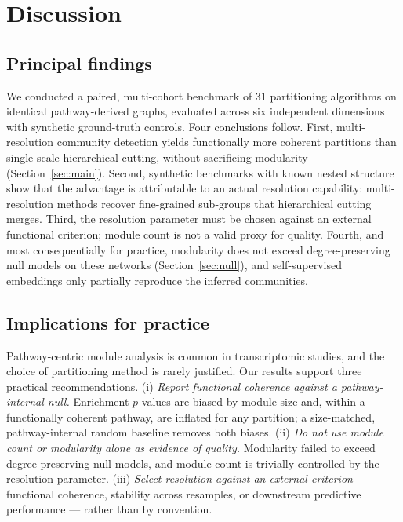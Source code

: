 \documentclass[twocolumn,11pt]{article}
\begin{document}
\section{Discussion}

\subsection{Principal findings}

We conducted a paired, multi-cohort benchmark of 31 partitioning algorithms on identical
pathway-derived graphs, evaluated across six independent dimensions with synthetic
ground-truth controls. Four conclusions follow. First, multi-resolution community detection
yields functionally more coherent partitions than single-scale hierarchical cutting, without
sacrificing modularity (Section~\ref{sec:main}). Second, synthetic benchmarks with known
nested structure show that the advantage is attributable to an actual resolution capability:
multi-resolution methods recover fine-grained sub-groups that hierarchical cutting merges.
Third, the resolution parameter must be chosen against an external functional criterion;
module count is not a valid proxy for quality. Fourth, and most consequentially for practice,
modularity does not exceed degree-preserving null models on these networks
(Section~\ref{sec:null}), and self-supervised embeddings only partially reproduce the
inferred communities.

\subsection{Implications for practice}

Pathway-centric module analysis is common in transcriptomic studies, and the choice of
partitioning method is rarely justified. Our results support three practical
recommendations. (i) \emph{Report functional coherence against a pathway-internal null.}
Enrichment $p$-values are biased by module size and, within a functionally coherent pathway,
are inflated for any partition; a size-matched, pathway-internal random baseline removes
both biases. (ii) \emph{Do not use module count or modularity alone as evidence of quality.}
Modularity failed to exceed degree-preserving null models, and module count is trivially
controlled by the resolution parameter. (iii) \emph{Select resolution against an external
criterion} --- functional coherence, stability across resamples, or downstream predictive
performance --- rather than by convention.
\end{document}
